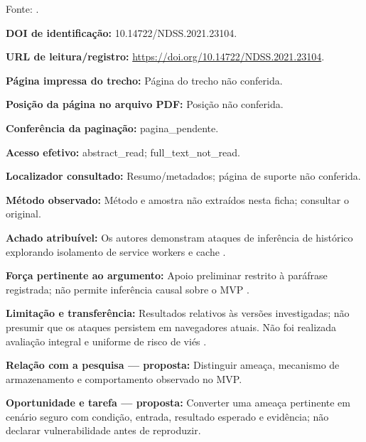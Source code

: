 Fonte: \citet{OS03}.

\noindent\textbf{DOI de identificação:} 10.14722/NDSS.2021.23104.\par\medskip

\noindent\textbf{URL de leitura/registro:} \url{https://doi.org/10.14722/NDSS.2021.23104}.\par\medskip

\noindent\textbf{Página impressa do trecho:} Página do trecho não conferida.\par\medskip

\noindent\textbf{Posição da página no arquivo PDF:} Posição não conferida.\par\medskip

\noindent\textbf{Conferência da paginação:} pagina\_pendente.\par\medskip

\noindent\textbf{Acesso efetivo:} abstract\_read; full\_text\_not\_read.\par\medskip

\noindent\textbf{Localizador consultado:} Resumo/metadados; página de suporte não conferida.\par\medskip

\noindent\textbf{Método observado:} Método e amostra não extraídos nesta ficha; consultar o original.\par\medskip

\noindent\textbf{Achado atribuível:} Os autores demonstram ataques de inferência de histórico explorando isolamento de service workers e cache \citep{OS03}.\par\medskip

\noindent\textbf{Força pertinente ao argumento:} Apoio preliminar restrito à paráfrase registrada; não permite inferência causal sobre o MVP \citep{OS03}.\par\medskip

\noindent\textbf{Limitação e transferência:} Resultados relativos às versões investigadas; não presumir que os ataques persistem em navegadores atuais. Não foi realizada avaliação integral e uniforme de risco de viés \citep{OS03}.\par\medskip

\noindent\textbf{Relação com a pesquisa — proposta:} Distinguir ameaça, mecanismo de armazenamento e comportamento observado no MVP.\par\medskip

\noindent\textbf{Oportunidade e tarefa — proposta:} Converter uma ameaça pertinente em cenário seguro com condição, entrada, resultado esperado e evidência; não declarar vulnerabilidade antes de reproduzir.\par\medskip

